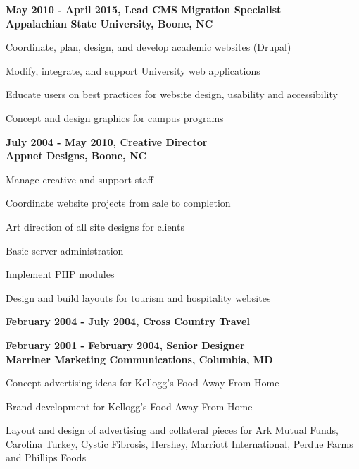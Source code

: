 \documentclass[letterpaper,10pt,final]{memoir}
\newcommand{\Sep}{\vspace{1.5em}}
\newcommand{\CVItem}[1]
	{\textbf{\color{BrickRed} #1}}
\begin{document}
\CVItem{May 2010 - April 2015, Lead CMS Migration Specialist\\
Appalachian State University, Boone, NC}
\begin{compactitem}[\color{BrickRed}$\circ$]
	\item Coordinate, plan, design, and develop academic websites (Drupal)
	\item Modify, integrate, and support University web applications
	\item Educate users on best practices for website design, usability and accessibility
	\item Concept and design graphics for campus programs
\end{compactitem}
\Sep

\CVItem{July 2004 - May 2010, Creative Director\\
Appnet Designs, Boone, NC}
\begin{compactitem}[\color{BrickRed}$\circ$]
	\item Manage creative and support staff
	\item Coordinate website projects from sale to completion
	\item Art direction of all site designs for clients
	\item Basic server administration
	\item Implement PHP modules
	\item Design and build layouts for tourism and hospitality websites
\end{compactitem}
\Sep

\CVItem{February 2004 - July 2004, Cross Country Travel}
\Sep

\CVItem{February 2001 - February 2004, Senior Designer\\
Marriner Marketing Communications, Columbia, MD}
\begin{compactitem}[\color{BrickRed}$\circ$]
	\item Concept advertising ideas for Kellogg's Food Away From Home
	\item Brand development for Kellogg's Food Away From Home
	\item Layout and design of advertising and collateral pieces for Ark Mutual Funds, Carolina Turkey, Cystic Fibrosis, Hershey, Marriott International, Perdue Farms and Phillips Foods
\end{compactitem}
\Sep

\clearpage
\framebreak
\framebreak
\end{document}
